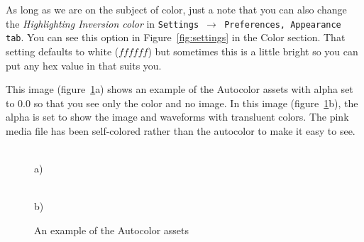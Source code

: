 As long as we are on the subject of color, just a note that you can also change the \textit{Highlighting Inversion color} in \texttt{Settings $\rightarrow$ Preferences, Appearance tab}.  You can see this option in Figure~\ref{fig:settings} in the Color section.  
That setting defaults to white ($ffffff$) but sometimes this is a little bright so you can put any hex value in that suits you.

This image (figure~\ref{fig:autocolor_assets_alpha}a) shows an example of the Autocolor assets with alpha set to 0.0 so that you see only the color and no image.
In this image (figure~\ref{fig:autocolor_assets_alpha}b), the alpha is set to show the image
and waveforms with transluent colors.  The pink media file has been self-colored rather than the autocolor to make it easy to see.

\begin{figure}[htpb]
    \centering
    \begin{minipage}[h]{0.55\linewidth}
         \\ a)
    \end{minipage}
    \begin{minipage}[h]{0.4\linewidth}
         \\ b)
    \end{minipage}
    \caption{An example of the Autocolor assets}
    \label{fig:autocolor_assets_alpha}
\end{figure}


